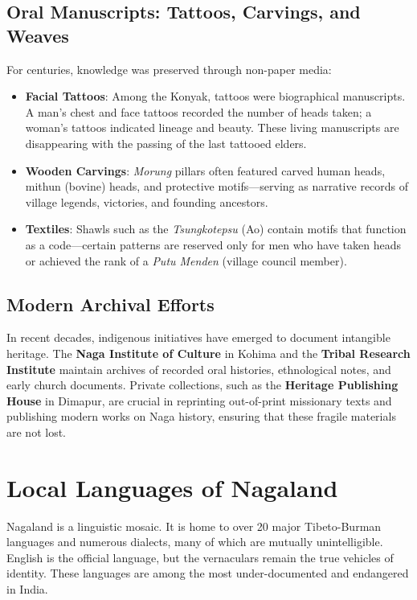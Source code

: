 \documentclass{article}
\begin{document}
\subsection{Oral Manuscripts: Tattoos, Carvings, and Weaves}
For centuries, knowledge was preserved through non-paper media:
\begin{itemize}
    \item \textbf{Facial Tattoos}: Among the Konyak, tattoos were biographical manuscripts. A man's chest and face tattoos recorded the number of heads taken; a woman's tattoos indicated lineage and beauty. These living manuscripts are disappearing with the passing of the last tattooed elders.
    \item \textbf{Wooden Carvings}: \textit{Morung} pillars often featured carved human heads, mithun (bovine) heads, and protective motifs—serving as narrative records of village legends, victories, and founding ancestors.
    \item \textbf{Textiles}: Shawls such as the \textit{Tsungkotepsu} (Ao) contain motifs that function as a code—certain patterns are reserved only for men who have taken heads or achieved the rank of a \textit{Putu Menden} (village council member).
\end{itemize}

\subsection{Modern Archival Efforts}
In recent decades, indigenous initiatives have emerged to document intangible heritage. The \textbf{Naga Institute of Culture} in Kohima and the \textbf{Tribal Research Institute} maintain archives of recorded oral histories, ethnological notes, and early church documents. Private collections, such as the \textbf{Heritage Publishing House} in Dimapur, are crucial in reprinting out-of-print missionary texts and publishing modern works on Naga history, ensuring that these fragile materials are not lost.

\section{Local Languages of Nagaland}
Nagaland is a linguistic mosaic. It is home to over 20 major Tibeto-Burman languages and numerous dialects, many of which are mutually unintelligible. English is the official language, but the vernaculars remain the true vehicles of identity. These languages are among the most under-documented and endangered in India.
\end{document}
